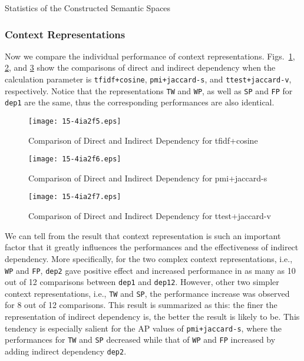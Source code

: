 \documentclass[english]{jnlp_1.4}
\begin{document}
\begin{table}[t]
\caption{Statistics of the Constructed Semantic Spaces}
\label{table_data_size}
\begin{center}

\end{center}
\end{table}

\subsubsection{Context Representations}

Now we compare the individual performance of context
representations. Figs.~\ref{fig_exp_tfidf}, \ref{fig_exp_pmi}, and
\ref{fig_exp_ttest} show the comparisons of direct and indirect
dependency when the calculation parameter is \verb|tfidf+cosine|,
\verb|pmi+jaccard-s|, and \verb|ttest+jaccard-v|, respectively.
Notice that the representations \verb|TW| and \verb|WP|, as well as
\verb|SP| and \verb|FP| for \verb|dep1| are the same, thus the
corresponding performances are also identical.

\begin{figure}[t]
\begin{center}
\texttt{[image: 15-4ia2f5.eps]}
\caption{Comparison of Direct and Indirect Dependency for tfidf+cosine}
\label{fig_exp_tfidf}
\end{center}
\end{figure}
\begin{figure}[t]
\begin{center}
\texttt{[image: 15-4ia2f6.eps]}
\caption{Comparison of Direct and Indirect Dependency for pmi+jaccard-s}
\label{fig_exp_pmi}
\end{center}
\end{figure}
\begin{figure}[t]
\begin{center}
\texttt{[image: 15-4ia2f7.eps]}
\caption{Comparison of Direct and Indirect Dependency for ttest+jaccard-v}
\label{fig_exp_ttest}
\end{center}
\vspace{-1\baselineskip}
\end{figure}

We can tell from the result that context representation is such an
important factor that it greatly influences the performances and the
effectiveness of indirect dependency. More specifically, for the two
complex context representations, i.e., \verb|WP| and \verb|FP|,
\verb|dep2| gave positive effect and increased performance in as many
as 10 out of 12 comparisons between \verb|dep1| and
\verb|dep12|. However, other two simpler context representations,
i.e., \verb|TW| and \verb|SP|, the performance increase was observed
for 8 out of 12 comparisons. This result is summarized as this: the
finer the representation of indirect dependency is, the better the
result is likely to be. This tendency is especially salient for the AP
values of \verb|pmi+jaccard-s|, where the performances for \verb|TW|
and \verb|SP| decreased while that of \verb|WP| and \verb|FP|
increased by adding indirect dependency \verb|dep2|.
\end{document}
